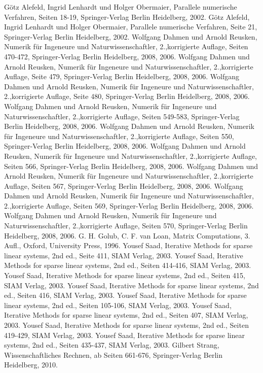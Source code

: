 \begin{thebibliography}{56}

Götz Alefeld, Ingrid Lenhardt und Holger Obermaier,
Parallele numerische Verfahren,
Seiten 18-19,
Springer-Verlag Berlin Heidelberg,
2002.
Götz Alefeld, Ingrid Lenhardt und Holger Obermaier,
Parallele numerische Verfahren,
Seite 21,
Springer-Verlag Berlin Heidelberg,
2002.
Wolfgang Dahmen und Arnold Reusken,
Numerik für Ingeneure und Naturwissenschaftler,
2.,korrigierte Auflage,
Seiten 470-472,
Springer-Verlag Berlin Heidelberg,
2008, 2006.
Wolfgang Dahmen und Arnold Reusken,
Numerik für Ingeneure und Naturwissenschaftler,
2.,korrigierte Auflage,
Seite 479,
Springer-Verlag Berlin Heidelberg,
2008, 2006.
Wolfgang Dahmen und Arnold Reusken,
Numerik für Ingeneure und Naturwissenschaftler,
2.,korrigierte Auflage,
Seite 480,
Springer-Verlag Berlin Heidelberg,
2008, 2006.
Wolfgang Dahmen und Arnold Reusken,
Numerik für Ingeneure und Naturwissenschaftler,
2.,korrigierte Auflage,
Seiten 549-583,
Springer-Verlag Berlin Heidelberg,
2008, 2006.
Wolfgang Dahmen und Arnold Reusken,
Numerik für Ingeneure und Naturwissenschaftler,
2.,korrigierte Auflage,
Seiten 550,
Springer-Verlag Berlin Heidelberg,
2008, 2006.
Wolfgang Dahmen und Arnold Reusken,
Numerik für Ingeneure und Naturwissenschaftler,
2.,korrigierte Auflage,
Seiten 566,
Springer-Verlag Berlin Heidelberg,
2008, 2006.
Wolfgang Dahmen und Arnold Reusken,
Numerik für Ingeneure und Naturwissenschaftler,
2.,korrigierte Auflage,
Seiten 567,
Springer-Verlag Berlin Heidelberg,
2008, 2006.
Wolfgang Dahmen und Arnold Reusken,
Numerik für Ingeneure und Naturwissenschaftler,
2.,korrigierte Auflage,
Seiten 569,
Springer-Verlag Berlin Heidelberg,
2008, 2006.
Wolfgang Dahmen und Arnold Reusken,
Numerik für Ingeneure und Naturwissenschaftler,
2.,korrigierte Auflage,
Seiten 570,
Springer-Verlag Berlin Heidelberg,
2008, 2006.
G. H. Golub, C. F. van Loan,
Matrix Computations,
3. Aufl.,
Oxford,
University Press,
1996.
Yousef Saad,
Iterative Methods for sparse linear systems,
2nd ed.,
Seite 411,
SIAM Verlag,
2003.
Yousef Saad,
Iterative Methods for sparse linear systems,
2nd ed.,
Seiten 414-416,
SIAM Verlag,
2003.
Yousef Saad,
Iterative Methods for sparse linear systems,
2nd ed.,
Seiten 415,
SIAM Verlag,
2003.
Yousef Saad,
Iterative Methods for sparse linear systems,
2nd ed.,
Seiten 416,
SIAM Verlag,
2003.
Yousef Saad,
Iterative Methods for sparse linear systems,
2nd ed.,
Seiten 105-106,
SIAM Verlag,
2003.
Yousef Saad,
Iterative Methods for sparse linear systems,
2nd ed.,
Seiten 407,
SIAM Verlag,
2003.
Yousef Saad,
Iterative Methods for sparse linear systems,
2nd ed.,
Seiten 419-429,
SIAM Verlag,
2003.
Yousef Saad,
Iterative Methods for sparse linear systems,
2nd ed.,
Seiten 435-437,
SIAM Verlag,
2003.
Gilbert Strang,
Wissenschaftliches Rechnen,
ab Seiten 661-676,
Springer-Verlag Berlin Heidelberg,
2010.


\end{thebibliography}
